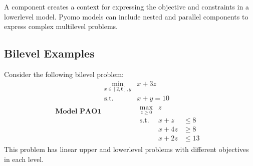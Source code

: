 \documentclass[letterpaper,10pt,english]{sphinxmanual}
\begin{document}
A {\hyperref[\detokenize{reference/pyomo:pao.pyomo.components.SubModel}]{}} component creates a context for expressing the
objective and constraints in a lower\sphinxhyphen{}level model.  Pyomo models can
include nested and parallel {\hyperref[\detokenize{reference/pyomo:pao.pyomo.components.SubModel}]{}} components to express
complex multilevel problems.


\subsection{Bilevel Examples}
\label{\detokenize{representations/pyomo:bilevel-examples}}
Consider the following bilevel problem:
\label{equation:sand:eq-pao1} \begin{equation*}
 \textbf{Model PAO1}
 \begin{array}{ll}
 \min_{x\in[2,6],y} & x + 3 z \\
 \textrm{s.t.} & x + y = 10\\
 & \begin{array}{lll}
   \max_{z \geq 0} & z &\\
   \textrm{s.t.} & x+z &\leq 8\\
   & x + 4 z &\geq 8\\
   & x + 2 z &\leq 13
   \end{array}
 \end{array}
 \end{equation*}
This problem has linear upper\sphinxhyphen{} and lower\sphinxhyphen{}level problems with different
objectives in each level.
\end{document}
